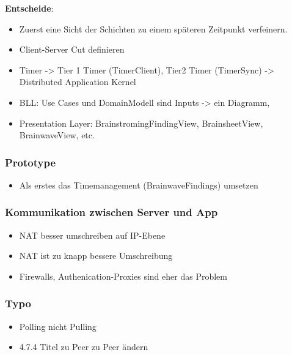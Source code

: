 \textbf{Entscheide}:
\begin{itemize}

\item
  Zuerst eine Sicht der Schichten zu einem späteren Zeitpunkt
  verfeinern.
\item
  Client-Server Cut definieren
\item
  Timer -\textgreater{} Tier 1 Timer (TimerClient), Tier2 Timer
  (TimerSync) -\textgreater{} Distributed Application Kernel
\item
  BLL: Use Cases und DomainModell sind Inputs -\textgreater{} ein
  Diagramm,
\item
  Presentation Layer: BrainstromingFindingView, BrainsheetView,
  BrainwaveView, etc.
\end{itemize}

\hypertarget{prototype}{%
\subsubsection*{Prototype}\label{prototype}}

\begin{itemize}

\item
  Als erstes das Timemanagement (BrainwaveFindings) umsetzen
\end{itemize}

\hypertarget{kommunikation-zwischen-server-und-app}{%
\subsubsection*{Kommunikation zwischen Server und
App}\label{kommunikation-zwischen-server-und-app}}

\begin{itemize}

\item
  NAT besser umschreiben auf IP-Ebene
\item
  NAT ist zu knapp bessere Umschreibung
\item
  Firewalls, Authenication-Proxies sind eher das Problem
\end{itemize}

\hypertarget{typo}{%
\subsubsection*{Typo}\label{typo}}

\begin{itemize}

\item
  Polling nicht Pulling
\item
  4.7.4 Titel zu Peer zu Peer ändern
\end{itemize}


